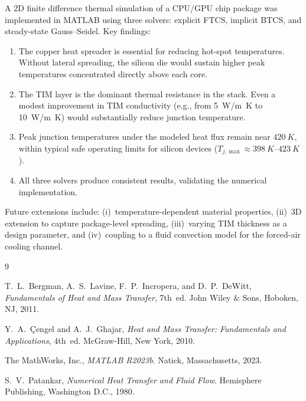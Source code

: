 \documentclass[10pt,twocolumn]{article}
\begin{document}
A 2D finite difference thermal simulation of a CPU/GPU chip package was
implemented in MATLAB using three solvers: explicit FTCS, implicit BTCS,
and steady-state Gauss--Seidel. Key findings:

\begin{enumerate}[leftmargin=*,label=\arabic*.]
  \item The copper heat spreader is essential for reducing hot-spot
    temperatures. Without lateral spreading, the silicon die would
    sustain higher peak temperatures concentrated directly above each core.
  \item The TIM layer is the dominant thermal resistance in the stack.
    Even a modest improvement in TIM conductivity (e.g., from
    \SI{5}{W/m.K} to \SI{10}{W/m.K}) would substantially reduce
    junction temperature.
  \item Peak junction temperatures under the modeled heat flux remain near
    $\SI{420}{K}$, within typical safe operating limits for silicon devices
    ($T_{j,\max} \approx \SI{398}{K}$--$\SI{423}{K}$).
  \item All three solvers produce consistent results, validating the
    numerical implementation.
\end{enumerate}

Future extensions include: (i)~temperature-dependent material properties,
(ii)~3D extension to capture package-level spreading, (iii)~varying TIM
thickness as a design parameter, and (iv)~coupling to a fluid convection
model for the forced-air cooling channel.

\begin{thebibliography}{9}

T.~L.~Bergman, A.~S.~Lavine, F.~P.~Incropera, and D.~P.~DeWitt,
\textit{Fundamentals of Heat and Mass Transfer}, 7th~ed.
John Wiley \& Sons, Hoboken, NJ, 2011.

Y.~A.~\c{C}engel and A.~J.~Ghajar,
\textit{Heat and Mass Transfer: Fundamentals and Applications}, 4th~ed.
McGraw-Hill, New York, 2010.

The MathWorks, Inc.,
\textit{MATLAB R2023b}.
Natick, Massachusetts, 2023.

S.~V.~Patankar,
\textit{Numerical Heat Transfer and Fluid Flow}.
Hemisphere Publishing, Washington D.C., 1980.

\end{thebibliography}
\end{document}
